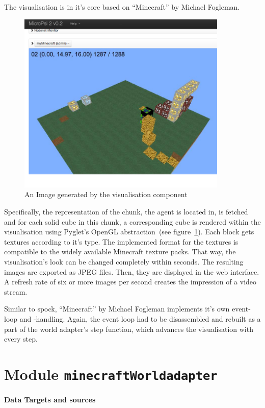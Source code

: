 The visualisation is in it's core based on ``Minecraft'' by Michael Fogleman.

\begin{figure}[h]
  \centering
    \includegraphics[width=10cm]{graphics/visualisation_screen}
  \caption{An Image generated by the visualisation component}
  \label{vis_screen}
\end{figure}

Specifically, the representation of the chunk, the agent is located in, is fetched and for each solid cube in this chunk, a corresponding cube is rendered within the visualisation using Pyglet's OpenGL abstraction~(see figure~\ref{vis_screen}). Each block gets textures according to it's type. The implemented format for the textures is compatible to the widely available Minecraft texture packs. That way, the visualisation's look can be changed completely within seconds. The resulting images are exported as JPEG files. Then, they are displayed in the web interface. A refresh rate of six or more images per second creates the impression of a video stream.

Similar to spock, ``Minecraft'' by Michael Fogleman implements it's own event-loop and -handling. Again, the event loop had to be disassembled and rebuilt as a part of the world adapter's step function, which advances the visualisation with every step.

    \section{Module \texttt{minecraftWorldadapter}}
    
\paragraph{Data Targets and sources}

